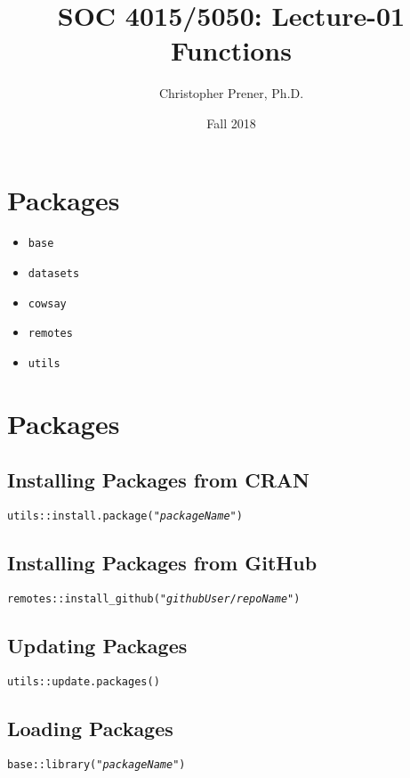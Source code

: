 \documentclass{tufte-handout}
\title{SOC 4015/5050: Lecture-01 Functions}
\author{Christopher Prener, Ph.D.}
\date{Fall 2018}
\begin{document}
\maketitle %

\vspace{5mm}
\section{Packages}
\begin{itemize}
\item \texttt{base}
\item \texttt{datasets}
\item \texttt{cowsay}
\item \texttt{remotes}
\item \texttt{utils}
\end{itemize}

\vspace{5mm}
\section{Packages}
\subsection{Installing Packages from CRAN}
\texttt{utils::}{\color{red}\texttt{install.package}}\texttt{("\textit{packageName}")}

\vspace{3mm}
\subsection{Installing Packages from GitHub}
\texttt{remotes::}{\color{red}\texttt{install\_github}}\texttt{("\textit{githubUser}/\textit{repoName}")}

\vspace{3mm}
\subsection{Updating Packages}
\texttt{utils::}{\color{red}\texttt{update.packages}}\texttt{()}

\vspace{3mm}
\subsection{Loading Packages}
\texttt{base::}{\color{red}\texttt{library}}\texttt{("\textit{packageName}")}
\end{document}

